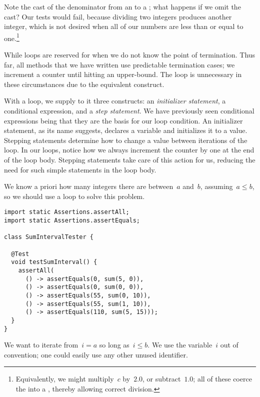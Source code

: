 Note the cast of the denominator from an  to a ; what happens if we omit the cast? 
Our tests would fail, because dividing two integers produces another integer, which is not desired when all of our numbers are less than or equal to one.\footnote{Equivalently, we might multiply~$c$ by~$2.0$, or subtract~$1.0$; all of these coerce the  into a , thereby allowing correct division.}

While loops are reserved for when we do not know the point of termination. 
Thus far, all methods that we have written use predictable termination cases; we increment a counter until hitting an upper-bound. 
The  loop is unnecessary in these circumstances due to the equivalent  construct.

With a  loop, we supply to it three constructs: an \emph{initializer statement}, a conditional expression, and a \emph{step statement}.
We have previously seen conditional expressions being that they are the basis for our  loop condition. 
An initializer statement, as its name suggests, declares a variable and initializes it to a value. 
Stepping statements determine how to change a value between iterations of the loop. 
In our  loops, notice how we always increment the counter by one at the end of the loop body. 
Stepping statements take care of this action for us, reducing the need for such simple statements in the loop body.

We know a priori how many integers there are between~$a$ and~$b$, assuming~$a \leq b$, so we should use a  loop to solve this problem.

\begin{lstlisting}[language=MyJava]
import static Assertions.assertAll;
import static Assertions.assertEquals;

class SumIntervalTester {

  @Test
  void testSumInterval() {
    assertAll(
      () -> assertEquals(0, sum(5, 0)),
      () -> assertEquals(0, sum(0, 0)),
      () -> assertEquals(55, sum(0, 10)),
      () -> assertEquals(55, sum(1, 10)),
      () -> assertEquals(110, sum(5, 15)));
  }
}
\end{lstlisting}

We want to iterate from~$i = a$ so long as~$i \leq b$. 
We use the variable~$i$ out of convention; one could easily use any other unused identifier.


